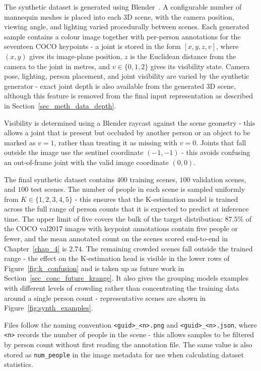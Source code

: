 The synthetic dataset is generated using Blender~\cite{blender}.
A configurable number of mannequin meshes is placed into each 3D scene,
with the camera position, viewing angle, and lighting varied procedurally between scenes.
Each generated sample contains a colour image
together with per-person annotations for the seventeen COCO keypoints -
a joint is stored in the form $[x,y,z,v]$,
where $(x,y)$ gives its image-plane position,
$z$ is the Euclidean distance from the camera to the joint in metres,
and $v \in \{0,1,2\}$ gives its visibility state.
Camera pose, lighting, person placement, and joint visibility are varied by the synthetic generator -
exact joint depth is also available from the generated 3D scene,
although this feature is removed from the final input representation
as described in Section~\ref{sec_meth_data_depth}.

Visibility is determined using a Blender raycast against the scene geometry -
this allows a joint that is present but occluded by another person or an object
to be marked as $v=1$,
rather than treating it as missing with $v=0$.
Joints that fall outside the image use the sentinel coordinate $(-1,-1)$ -
this avoids confusing an out-of-frame joint with the valid image coordinate $(0,0)$.

The final synthetic dataset contains $400$ training scenes, $100$ validation scenes, and $100$ test scenes.
The number of people in each scene is sampled uniformly from $K \in \{1,2,3,4,5\}$ -
this ensures that the K-estimation model is trained
across the full range of person counts that it is expected to predict at inference time.
The upper limit of five covers the bulk of the target distribution:
$87.5\%$ of the COCO val2017 images with keypoint annotations contain five people or fewer,
and the mean annotated count on the scenes scored end-to-end in Chapter~\ref{chap_4} is $2.74$.
The remaining crowded scenes fall outside the trained range -
the effect on the K-estimation head is visible in the lower rows of Figure~\ref{fig:k_confusion}
and is taken up as future work in Section~\ref{sec_conc_future_krange}.
It also gives the grouping models examples with different levels of crowding
rather than concentrating the training data around a single person count -
representative scenes are shown in Figure~\ref{fig:synth_examples}.

Files follow the naming convention \texttt{<guid>\_<n>.png} and \texttt{<guid>\_<n>.json},
where \texttt{<n>} records the number of people in the scene -
this allows samples to be filtered by person count without first reading the annotation file.
The same value is also stored as \texttt{num\_people} in the image metadata
for use when calculating dataset statistics.

